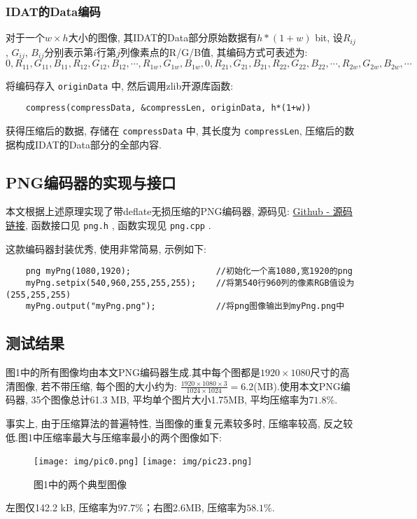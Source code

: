 \documentclass[UTF8]{ctexart}
\begin{document}
\subsubsection{IDAT的Data编码}

对于一个$w\times h$大小的图像, 其IDAT的Data部分原始数据有$h*(1+w)$ bit, 设$R_{ij}$, $G_{ij}$, $B_{ij}$分别表示第$i$行第$j$列像素点的R/G/B值, 其编码方式可表述为: 
\begin{equation*}
    0,R_{11},G_{11},B_{11},R_{12},G_{12},B_{12},\cdots,R_{1w},G_{1w},B_{1w},0,R_{21},G_{21},B_{21},R_{22},G_{22},B_{22},\cdots,R_{2w},G_{2w},B_{2w},\cdots
\end{equation*}

将编码存入 \verb |originData| 中, 然后调用zlib开源库函数: 

\begin{verbatim}
    compress(compressData, &compressLen, originData, h*(1+w))
\end{verbatim}

获得压缩后的数据, 存储在 \verb |compressData| 中, 其长度为 \verb |compressLen|, 压缩后的数据构成IDAT的Data部分的全部内容.

\subsection{PNG编码器的实现与接口}

本文根据上述原理实现了带deflate无损压缩的PNG编码器, 源码见: \href{https://Github.com/EbolaEmperor/MathSoftware/tree/main/Homework-4}{Github - 源码链接}, 函数接口见 \verb |png.h| , 函数实现见 \verb |png.cpp| .

这款编码器封装优秀, 使用非常简易, 示例如下: 

\begin{verbatim}
    png myPng(1080,1920);                 //初始化一个高1080,宽1920的png
    myPng.setpix(540,960,255,255,255);    //将第540行960列的像素RGB值设为(255,255,255)
    myPng.output("myPng.png");            //将png图像输出到myPng.png中
\end{verbatim}

\subsection{测试结果}

图1中的所有图像均由本文PNG编码器生成.其中每个图都是$1920\times 1080$尺寸的高清图像, 若不带压缩, 每个图的大小约为: $\frac{1920\times 1080\times 3}{1024\times 1024}=6.2$(MB).使用本文PNG编码器, 35个图像总计61.3 MB, 平均单个图片大小1.75MB, 平均压缩率为$71.8\%$.

事实上, 由于压缩算法的普遍特性, 当图像的重复元素较多时, 压缩率较高, 反之较低.图1中压缩率最大与压缩率最小的两个图像如下: 

\begin{figure}[H]
    \centering
    \texttt{[image: img/pic0.png]}
    \hspace{15mm}
    \texttt{[image: img/pic23.png]}
    \caption{图1中的两个典型图像}
\end{figure}

左图仅142.2 kB, 压缩率为$97.7\%$；右图2.6MB, 压缩率为$58.1\%$.



\end{document}
